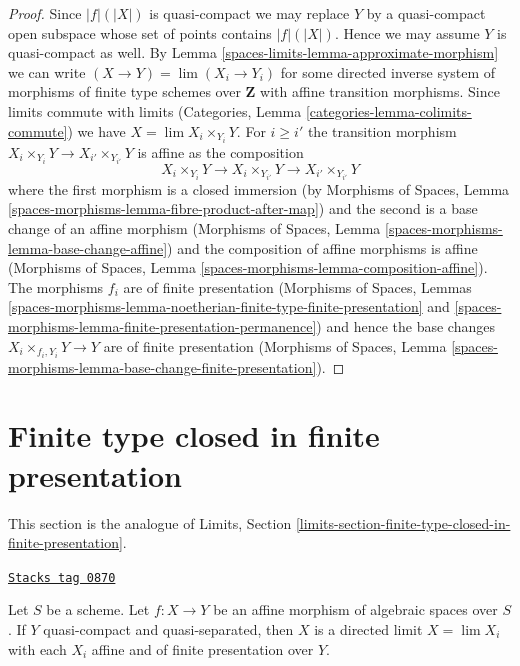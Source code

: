 \begin{proof}
Since $|f|(|X|)$ is quasi-compact we may replace $Y$ by a quasi-compact
open subspace whose set of points contains $|f|(|X|)$. Hence we may assume
$Y$ is quasi-compact as well.
By Lemma \ref{spaces-limits-lemma-approximate-morphism} we can write
$(X \to Y) = \lim (X_i \to Y_i)$ for some directed inverse system
of morphisms of finite type schemes over $\mathbf{Z}$ with
affine transition morphisms. Since limits commute with limits
(Categories, Lemma \ref{categories-lemma-colimits-commute})
we have $X = \lim X_i \times_{Y_i} Y$. For $i \geq i'$
the transition morphism
$X_i \times_{Y_i} Y \to X_{i'} \times_{Y_{i'}} Y$ is affine as
the composition
$$
X_i \times_{Y_i} Y \to X_i \times_{Y_{i'}} Y \to X_{i'} \times_{Y_{i'}} Y
$$
where the first morphism is a closed immersion (by
Morphisms of Spaces, Lemma
\ref{spaces-morphisms-lemma-fibre-product-after-map})
and the second is a base change of an affine morphism
(Morphisms of Spaces, Lemma \ref{spaces-morphisms-lemma-base-change-affine})
and the composition of affine morphisms is affine
(Morphisms of Spaces, Lemma \ref{spaces-morphisms-lemma-composition-affine}).
The morphisms $f_i$ are of finite presentation
(Morphisms of Spaces, Lemmas
\ref{spaces-morphisms-lemma-noetherian-finite-type-finite-presentation} and
\ref{spaces-morphisms-lemma-finite-presentation-permanence})
and hence the base changes $X_i \times_{f_i, Y_i} Y \to Y$
are of finite presentation
(Morphisms of Spaces, Lemma
\ref{spaces-morphisms-lemma-base-change-finite-presentation}).
\end{proof}

\section{Finite type closed in finite presentation}
\label{spaces-limits-section-finite-type-closed-in-finite-presentation}
This section is the analogue of
Limits, Section \ref{limits-section-finite-type-closed-in-finite-presentation}.

\begin{lemma}
\label{spaces-limits-lemma-affine-morphism-is-limit}
\href{https://stacks.math.columbia.edu/tag/0870}{\texttt{Stacks tag 0870}}

Let $S$ be a scheme. Let $f : X \to Y$ be an affine morphism of algebraic
spaces over $S$. If $Y$ quasi-compact and
quasi-separated, then $X$ is a directed limit $X = \lim X_i$
with each $X_i$ affine and of finite presentation over $Y$.
\end{lemma}

